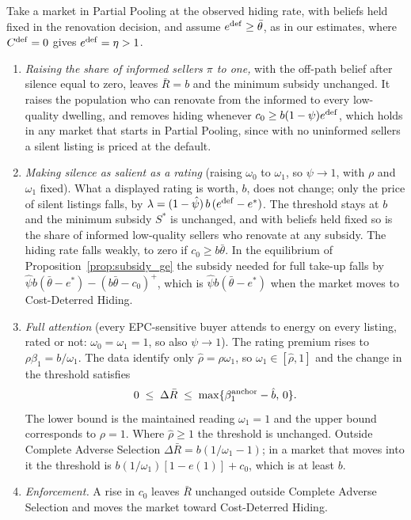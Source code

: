 \documentclass[10pt,letterpaper]{bp-template-concise}
\begin{document}
\begin{proposition}[Instruments]
\label{prop:instruments}
Take a market in Partial Pooling at the observed hiding rate, with beliefs held fixed in the renovation decision, and assume $e^{\rm def}\ge\bar\theta$, as in our estimates, where $C^{\rm def}=0$ gives $e^{\rm def}=\eta>1$.
\begin{enumerate}[label=(\roman*)]
    \item \emph{Raising the share of informed sellers $\pi$ to one,} with the off-path belief after silence equal to zero, leaves $\bar R=b$ and the minimum subsidy unchanged. It raises the population who can renovate from the informed to every low-quality dwelling, and removes hiding whenever $c_0\ge b(1-\psi)e^{\rm def}$, which holds in any market that starts in Partial Pooling, since with no uninformed sellers a silent listing is priced at the default.
    \item \emph{Making silence as salient as a rating} (raising $\omega_0$ to $\omega_1$, so $\psi\to1$, with $\rho$ and $\omega_1$ fixed). What a displayed rating is worth, $b$, does not change; only the price of silent listings falls, by $\lambda=(1-\hat\psi)\,b\,(e^{\rm def}-e^*)$. The threshold stays at $b$ and the minimum subsidy $S^*$ is unchanged, and with beliefs held fixed so is the share of informed low-quality sellers who renovate at any subsidy. The hiding rate falls weakly, to zero if $c_0\ge b\bar\theta$. In the equilibrium of Proposition~\ref{prop:subsidy_ge} the subsidy needed for full take-up falls by $\hat\psi b(\bar\theta-e^*)-(b\bar\theta-c_0)^+$, which is $\hat\psi b(\bar\theta-e^*)$ when the market moves to Cost-Deterred Hiding.
    \item \emph{Full attention} (every EPC-sensitive buyer attends to energy on every listing, rated or not: $\omega_0=\omega_1=1$, so also $\psi\to1$). The rating premium rises to $\rho\beta_1=b/\omega_1$. The data identify only $\hat\rho=\rho\omega_1$, so $\omega_1\in[\hat\rho,1]$ and the change in the threshold satisfies
    \[
        0\;\le\;\Delta\bar R\;\le\;\max\{\beta_1^{\rm anchor}-\hat b,\,0\}.
    \]
    The lower bound is the maintained reading $\omega_1=1$ and the upper bound corresponds to $\rho=1$. Where $\hat\rho\ge1$ the threshold is unchanged. Outside Complete Adverse Selection $\Delta\bar R=b(1/\omega_1-1)$; in a market that moves into it the threshold is $b(1/\omega_1)[1-e(1)]+c_0$, which is at least $b$.
    \item \emph{Enforcement.} A rise in $c_0$ leaves $\bar R$ unchanged outside Complete Adverse Selection and moves the market toward Cost-Deterred Hiding.
\end{enumerate}
\end{proposition}
\end{document}

